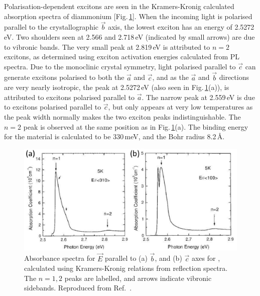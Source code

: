 Polarisation-dependent excitons are seen in the Kramers-Kronig calculated absorption spectra of diammonium  [Fig.\,\ref{2Fig14}]. When the incoming light is polarised parallel to the crystallographic $\vec{b}$ axis, the lowest exciton has an energy of 2.5272\,eV. Two shoulders seen at 2.566 and 2.718\,eV (indicated by small arrows) are due to vibronic bands. The very small peak at 2.819\,eV is attributed to $n=2$ excitons, as determined using exciton activation energies calculated from PL spectra. Due to the monoclinic crystal symmetry, light polarised parallel to $\vec{c}$ can generate excitons polarised to both the $\vec{a}$ and $\vec{c}$, and as the $\vec{a}$ and $\vec{b}$ directions are very nearly isotropic, the peak at 2.5272\,eV (also seen in Fig.\,\ref{2Fig14}(a)), is attributed to excitons polarised parallel to $\vec{a}$. The narrow peak at 2.559\,eV is due to excitons polarised parallel to $\vec{c}$, but only appears at very low temperatures as the peak width normally makes the two exciton peaks indistinguishable. The $n=2$ peak is observed at the same position as in Fig.\,\ref{2Fig14}(a). The binding energy for the material is calculated to be 330\,meV, and the Bohr radius 8.2\,\AA \cite{Goto2001}.
\begin{figure} [h!]
\centering
\includegraphics[width=\textwidth]{Fig14}
\caption{Absorbance spectra for $\vec{E}$ parallel to (a) $\vec{b}$, and (b) $\vec{c}$ axes for , calculated using Kramers-Kronig relations from reflection spectra. The $n=1, 2$ peaks are labelled, and arrows indicate vibronic sidebands. Reproduced from Ref.\ \cite{Goto2001}.}
\label{2Fig14}
\end{figure}


